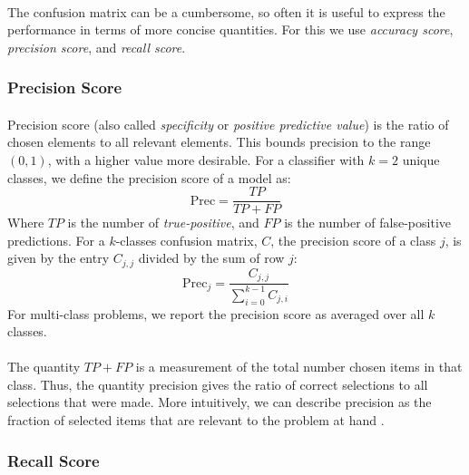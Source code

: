 \documentclass[12pt,letterpaper]{article}
\begin{document}
\paragraph*{}The confusion matrix can be a cumbersome, so often it is useful to express the performance in terms of more concise quantities. For this we use \textit{accuracy score}, \textit{precision score}, and \textit{recall score}.


\subsubsection{Precision Score}

\paragraph*{}Precision score (also called \textit{specificity} or \textit{positive predictive value}) is the ratio of chosen elements to all relevant elements. This bounds precision to the range $(0,1)$, with a higher value more desirable. For a classifier with $k = 2$ unique classes, we define the precision score of a model as:
\begin{equation}
\label{eqn-BinaryPrecision}
\text{Prec} = \frac{TP}{TP + FP}
\end{equation}
Where $TP$ is the number of \textit{true-positive}, and $FP$ is the number of false-positive predictions. For a $k$-classes confusion matrix, $C$, the precision score of a class $j$, is given by the entry $C_{j,j}$ divided by the sum of row $j$:
\begin{equation}
\label{eqn-KPrecision}
\text{Prec}_j = \frac{C_{j,j}}{\sum_{i=0}^{k-1}C_{j,i}}
\end{equation}
For multi-class problems, we report the precision score as averaged over all $k$ classes. 

\paragraph*{}The quantity $TP + FP$ is a measurement of the total number chosen items in that class. Thus, the quantity precision gives the ratio of correct selections to all selections that were made. More intuitively, we can describe precision as the fraction of selected items that are relevant to the problem at hand \cite{Geron}. 


\subsubsection{Recall Score}
\end{document}

